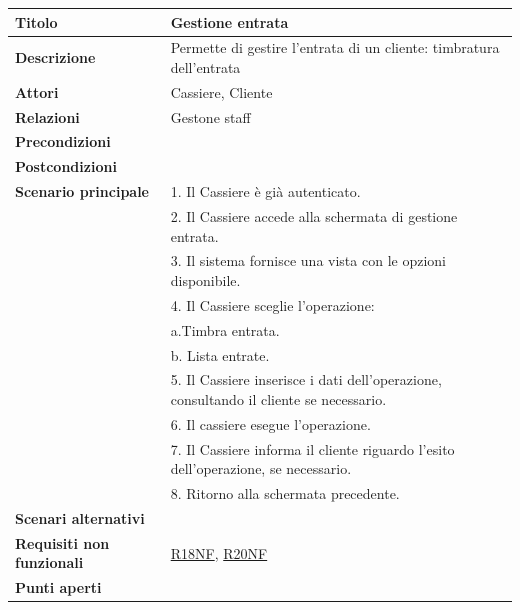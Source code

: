 \documentclass[a4paper]{article}
\begin{document}
\begin{center}
\begin{tabularx}{1\textwidth}{|l|X|}
    \hline
	\textbf{Titolo} & Gestione entrata \\
	\hline
	\textbf{Descrizione} & Permette di gestire l'entrata di un cliente: timbratura dell'entrata \\
	\hline
	\textbf{Attori} & Cassiere, Cliente \\
	\hline
	\textbf{Relazioni} & Gestone staff \\
	\hline
	\textbf{Precondizioni} &  \\
	\hline
	\textbf{Postcondizioni} &  \\
	\hline
	\textbf{Scenario principale} & 1. Il Cassiere è già autenticato.\\
	                             & 2. Il Cassiere accede alla schermata di gestione entrata. \\
								 & 3. Il sistema fornisce una vista con le opzioni disponibile.\\
								 & 4. Il Cassiere sceglie l'operazione:\\
								 & \quad a.Timbra entrata.\\
								 & \quad b. Lista entrate.\\
								 & 5. Il Cassiere inserisce i dati dell'operazione, consultando il cliente se necessario.\\
								 & 6. Il cassiere esegue l'operazione.\\
								 & 7. Il Cassiere informa il cliente riguardo l'esito dell'operazione, se necessario.\\
								 & 8. Ritorno alla schermata precedente.\\
	\hline
	\textbf{Scenari alternativi} & \\
	\hline
	\textbf{Requisiti non funzionali} & \hyperlink{R18NF}{R18NF}, \hyperlink{R20NF}{R20NF} \\
	\hline
	\textbf{Punti aperti} & \\
	\hline
\end{tabularx}
\end{center}


\end{document}
